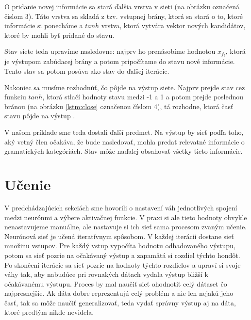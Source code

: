O pridanie novej informácie sa stará ďalšia vrstva v sieti (na obrázku označená číslom 3). Táto vrstva sa skladá z tzv. vstupnej brány, ktorá sa stará o to, ktoré informácie si ponecháme a $tanh$ vrstva, ktorá vytvára vektor nových kandidátov, ktoré by mohli byť pridané do stavu.

Stav siete teda upravíme nasledovne: najprv ho prenásobíme hodnotou $x_{f_t}$, ktorá je výstupom zabúdacej brány a potom pripočítame do stavu nové informácie. Tento stav sa potom posúva ako stav do ďalšej iterácie.

Nakoniec sa musíme rozhodnúť, čo pôjde na výstup siete. Najprv prejde stav cez funkciu $tanh$, ktorá stlačí hodnoty stavu medzi -1 a 1 a potom prejde poslednou bránou (na obrázku \ref{lstm:close} označenou číslom 4), tá rozhodne, ktorá časť stavu pôjde na výstup \citep{rnn:colah}.

V našom príklade sme teda dostali ďalší predmet. Na výstup by sieť podľa toho, aký vetný člen očakáva, že bude nasledovať, mohla predať relevatné informácie o gramatických kategóriách. Stav môže naďalej obsahovať všetky tieto informácie.


\section{Učenie} \label{learn}
V predchádzajúcich sekciách sme hovorili o nastavení váh jednotlivých spojení medzi neurónmi a výbere aktivačnej funkcie.
V praxi si ale tieto hodnoty obvykle nenastavujeme manuálne, ale nastavuje si ich sieť sama procesom zvaným učenie. Neurónová sieť je učená iteratívnym spôsobom. 
V každej iterácii dostane sieť množinu vstupov.
Pre každý vstup vypočíta hodnotu odhadovaného výstupu, potom sa sieť pozrie na očakávaný výstup a zapamätá si rozdiel týchto hondôt.
Po skončení iterácie sa sieť pozrie na hodnoty týchto rozdielov a upraví si svoje váhy tak, aby nabudúce pri rovnakých dátach vydala výstup bližší k očakávanému výstupu.
Proces by mal naučiť sieť ohodnotiť celý dátaset čo najpresnejšie.
Ak dáta dobre reprezentujú celý problém a nie len nejakú jeho časť, tak sa môže naučiť generalizovať, teda vydať správny výstup aj na dáta, ktoré predtým nikde nevidela.


